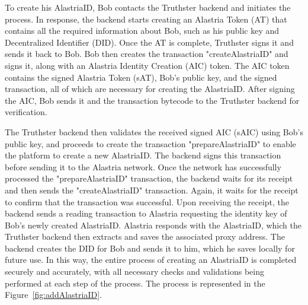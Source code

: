 \documentclass[target=mst,aauheader=]{thud}
\begin{document}
To create his AlastriaID, Bob contacts the Truthster backend and initiates the process. In response, the backend starts creating an Alastria Token (AT) that contains all the required information about Bob, such as his public key and Decentralized Identifier (DID). Once the AT is complete, Truthster signs it and sends it back to Bob. Bob then creates the transaction "createAlastriaID" and signs it, along with an Alastria Identity Creation (AIC) token. The AIC token contains the signed Alastria Token (sAT), Bob's public key, and the signed transaction, all of which are necessary for creating the AlastriaID. After signing the AIC, Bob sends it and the transaction bytecode to the Truthster backend for verification.\par
The Truthster backend then validates the received signed AIC (sAIC) using Bob's public key, and proceeds to create the transaction "prepareAlastriaID" to enable the platform to create a new AlastriaID. The backend signs this transaction before sending it to the Alastria network. Once the network has successfully processed the "prepareAlastriaID" transaction, the backend waits for its receipt and then sends the "createAlastriaID" transaction. Again, it waits for the receipt to confirm that the transaction was successful. Upon receiving the receipt, the backend sends a reading transaction to Alastria requesting the identity key of Bob's newly created AlastriaID. Alastria responds with the AlastriaID, which the Truthster backend then extracts and saves the associated proxy address. The backend creates the DID for Bob and sends it to him, which he saves locally for future use. In this way, the entire process of creating an AlastriaID is completed securely and accurately, with all necessary checks and validations being performed at each step of the process.
The process is represented in the Figure~\ref{fig:addAlastriaID}.
\end{document}
